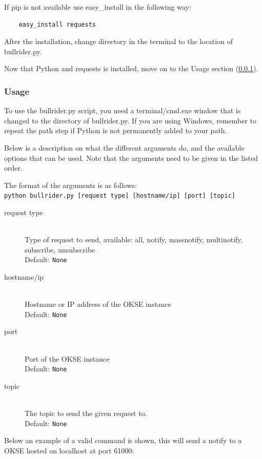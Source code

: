 If pip is not available use easy\_install in the following way:

\begin{verbatim}
    easy_install requests
\end{verbatim}

After the installation, change directory in the terminal to the location of bullrider.py.

Now that Python and requests is installed, move on to the Usage section (\ref{subsubsec:usermanual_Testscripts_usage}).


\subsubsection{Usage}
\label{subsubsec:usermanual_Testscripts_usage}
To use the bullrider.py script, you need a terminal/cmd.exe window that is changed to the directory of bullrider.py. If you are using Windows, remember to repeat the path step if Python is not permanently added to your path. 

Below is a description on what the different arguments do, and the available options that can be used. Note that the arguments need to be given in the listed order.

The format of the arguments is as follows:\\ \verb!python bullrider.py [request type] [hostname/ip] [port] [topic]!


\begin{description}
    \item[request type] \hfill \\
  Type of request to send, available: all, notify, massnotify, multinotify, subscribe, unsubscribe \hfill \\ Default: \verb!None!
    \item[hostname/ip] \hfill \\
  Hostname or IP address of the OKSE instance \hfill \\ Default: \verb!None!
    \item[port] \hfill \\
  Port of the OKSE instance \hfill \\ Default: \verb!None!
    \item[topic] \hfill \\
  The topic to send the given request to. \hfill \\ Default: \verb!None!
\end{description}
Below an example of a valid command is shown, this will send a notify to a OKSE hosted on localhost at port 61000:

